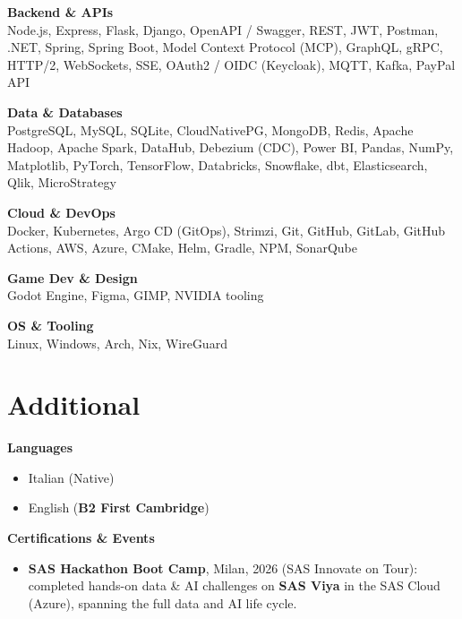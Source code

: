 \documentclass[10pt,a4paper]{article}
\begin{document}
\vspace{4pt}
\textbf{Backend \& APIs}\\
Node.js, Express, Flask, Django, OpenAPI / Swagger, REST, JWT, Postman, .NET, Spring, Spring Boot, Model Context Protocol (MCP), GraphQL, gRPC, HTTP/2, WebSockets, SSE, OAuth2 / OIDC (Keycloak), MQTT, Kafka, PayPal API

\vspace{4pt}
\textbf{Data \& Databases}\\
PostgreSQL, MySQL, SQLite, CloudNativePG, MongoDB, Redis, Apache Hadoop, Apache Spark, DataHub, Debezium (CDC),
Power BI, Pandas, NumPy, Matplotlib, PyTorch, TensorFlow, Databricks, Snowflake, dbt, Elasticsearch, Qlik, MicroStrategy

\vspace{4pt}
\textbf{Cloud \& DevOps}\\
Docker, Kubernetes, Argo CD (GitOps), Strimzi, Git, GitHub, GitLab, GitHub Actions, AWS, Azure, CMake, Helm, Gradle, NPM, SonarQube

\vspace{4pt}
\textbf{Game Dev \& Design}\\
Godot Engine, Figma, GIMP, NVIDIA tooling

\vspace{4pt}
\textbf{OS \& Tooling}\\
Linux, Windows, Arch, Nix, WireGuard

\section*{Additional}

\textbf{Languages}
\begin{itemize}
  \item Italian (Native)
  \item English (\textbf{B2 First Cambridge})
\end{itemize}

\vspace{4pt}
\textbf{Certifications \& Events}
\begin{itemize}
  \item \textbf{SAS Hackathon Boot Camp}, Milan, 2026 (SAS Innovate on Tour): completed hands-on data
        \& AI challenges on \textbf{SAS Viya} in the SAS Cloud (Azure), spanning the full data and AI life cycle.
\end{itemize}

\end{document}
